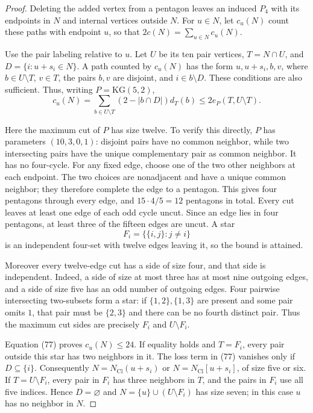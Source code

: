 \documentclass[11pt]{amsart}
\theoremstyle{definition}
\theoremstyle{remark}
\begin{document}
\begin{proof}
Deleting the added vertex from a pentagon leaves an induced $P_4$ with
its endpoints in $N$ and internal vertices outside $N$. For $u\in N$,
let $c_u(N)$ count these paths with endpoint $u$, so that
$2c(N)=\sum_{u\in N}c_u(N)$.

Use the pair labeling relative to $u$. Let $U$ be its ten pair vertices,
$T=N\cap U$, and $D=\{i:u+s_i\in N\}$. A path counted by $c_u(N)$
has the form $u,u+s_i,b,v$, where $b\in U\setminus T$, $v\in T$, the
pairs $b,v$ are disjoint, and $i\in b\setminus D$. These conditions
are also sufficient. Thus, writing $P=\mathrm{KG}(5,2)$,
\begin{equation}\tag{77}\label{eq:neighborhood-path-count}
 c_u(N)=\sum_{b\in U\setminus T}(2-|b\cap D|)d_T(b)
   \leq2e_P(T,U\setminus T).
\end{equation}

Here the maximum cut of $P$ has size twelve. To verify this directly,
$P$ has parameters $(10,3,0,1)$: disjoint pairs have no common
neighbor, while two intersecting pairs have the unique complementary
pair as common neighbor. It has no four-cycle. For any fixed edge,
choose one of the two other neighbors at each endpoint. The two choices
are nonadjacent and have a unique common neighbor; they therefore
complete the edge to a pentagon. This gives four pentagons through
every edge, and $15\cdot4/5=12$ pentagons in total. Every cut leaves
at least one edge of each odd cycle uncut. Since an edge lies in four
pentagons, at least three of the fifteen edges are uncut. A star
\[
 F_i=\{\{i,j\}:j\ne i\}
\]
is an independent four-set with twelve edges leaving it, so the bound
is attained.

Moreover every twelve-edge cut has a side of size four, and that side
is independent. Indeed, a side of size at most three has at most nine
outgoing edges, and a side of size five has an odd number of outgoing
edges. Four pairwise intersecting two-subsets form a star: if
$\{1,2\},\{1,3\}$ are present and some pair omits $1$, that pair must
be $\{2,3\}$ and there can be no fourth distinct pair. Thus the
maximum cut sides are precisely $F_i$ and $U\setminus F_i$.

Equation (77) proves $c_u(N)\leq24$. If equality holds and $T=F_i$,
every pair outside this star has two neighbors in it. The loss term in
(77) vanishes only if $D\subseteq\{i\}$. Consequently
$N=N_{\mathrm{Cl}}(u+s_i)$ or $N=N_{\mathrm{Cl}}[u+s_i]$, of size five
or six. If $T=U\setminus F_i$, every pair in $F_i$ has three neighbors
in $T$, and the pairs in $F_i$ use all five indices. Hence
$D=\varnothing$ and $N=\{u\}\cup(U\setminus F_i)$ has size seven;
in this case $u$ has no neighbor in $N$.


\end{proof}
\end{document}
